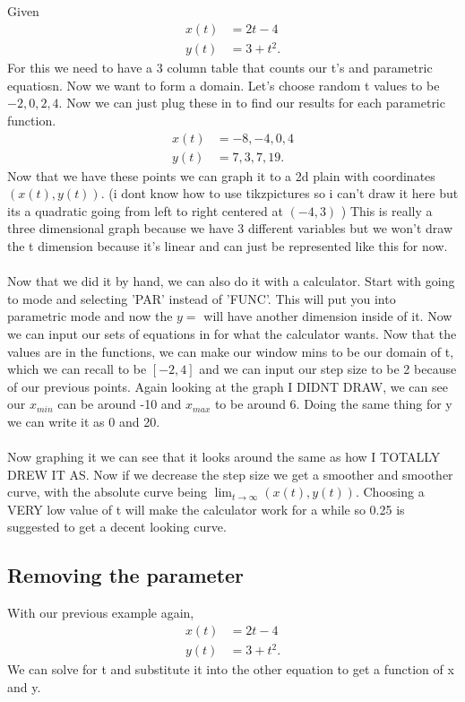 { Given 
\begin{align*}
	x\left( t \right) &= 2t -4 \\
	y\left( t \right) &=3+t^2
.\end{align*}
For this we need to have a 3 column table that counts our t's and parametric equatiosn. Now we want to form a domain. Let's choose random t values to be $ -2,0,2,4 $. Now we can just plug these in to find our results for each parametric function. 
\begin{align*}
	x\left( t \right) &= -8,-4,0,4 \\
	y\left( t \right) &= 7,3,7,19 
.\end{align*}
Now that we have these points we can graph it to a 2d plain with coordinates $ \left( x\left( t \right) , y\left( t \right)  \right)  $. (i dont know how to use tikzpictures so i can't draw it here but its a quadratic going from left to right centered at $ \left( -4,3 \right)  $ ) This is really a three dimensional graph because we have 3 different variables but we won't draw the t dimension because it's linear and can just be represented like this for now. \\ \\
} 
\newpage
Now that we did it by hand, we can also do it with a calculator. Start with going to mode and selecting 'PAR' instead of 'FUNC'. This will put you into parametric mode and now the $ y= $ will have another dimension inside of it. Now we can input our sets of equations in for what the calculator wants. Now that the values are in the functions, we can make our window mins to be our domain of t, which we can recall to be $ \left[ -2,4 \right]  $ and we can input our step size to be 2 because of our previous points. Again looking at the graph I DIDNT DRAW, we can see our $ x_{ min } $ can be around -10 and $ x_{ max } $ to be around 6. Doing the same thing for y we can write it as $ 0 $ and 20. \\ \\

Now graphing it we can see that it looks around the same as how I TOTALLY DREW IT AS. Now if we decrease the step size we get a smoother and smoother curve, with the absolute curve being $ \lim_{ t \to \infty} \left( x\left( t \right) , y\left( t \right)  \right)  $. Choosing a VERY low value of t will make the calculator work for a while so 0.25 is suggested to get a decent looking curve. 
\subsection{Removing the parameter}%
\label{sub:Removing the parameter}
With our previous example again, 
\begin{align*}
	x\left( t \right) &= 2t -4 \\
	y\left( t \right) &=3+t^2
.\end{align*}
We can solve for t and substitute it into the other equation to get a function of x and y.

